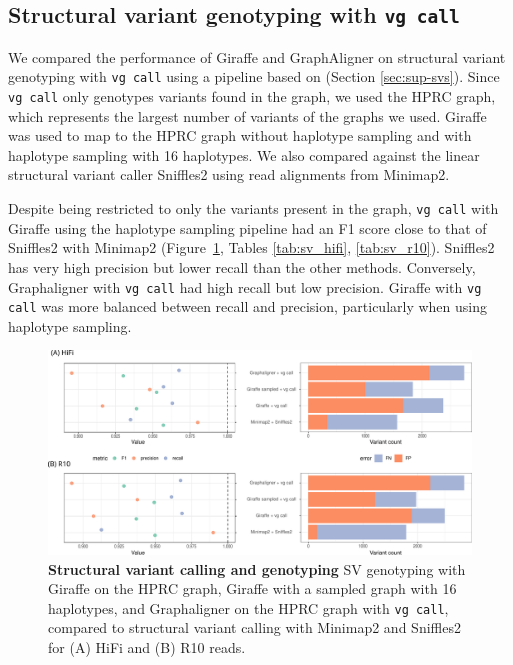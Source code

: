 \documentclass[11pt]{ucscthesis}
\begin{document}
\subsection{Structural variant genotyping with \texttt{vg call}}
We compared the performance of Giraffe and GraphAligner on structural variant genotyping with \texttt{vg call} using a pipeline based on \citet{hickey_vgsv_2020} (Section \ref{sec:sup-svs}).
Since \texttt{vg call} only genotypes variants found in the graph, we used the HPRC graph, which represents the largest number of variants of the graphs we used.
Giraffe was used to map to the HPRC graph without haplotype sampling and with haplotype sampling with 16 haplotypes.
We also compared against the linear structural variant caller Sniffles2 \cite{sedlazeck_sniffles_2018,smolka_sniffles2_2024} using read alignments from Minimap2.

Despite being restricted to only the variants present in the graph, \texttt{vg call} with Giraffe using the haplotype sampling pipeline had an F1 score close to that of Sniffles2 with Minimap2 (Figure~\ref{fig:sv_calling}, Tables \ref{tab:sv_hifi}, \ref{tab:sv_r10}).
Sniffles2 has very high precision but lower recall than the other methods.
Conversely, Graphaligner with \texttt{vg call} had high recall but low precision.
Giraffe with \texttt{vg call} was more balanced between recall and precision, particularly when using haplotype sampling.

\begin{figure}[htb]
    \centering
    \includegraphics[width=\columnwidth]{lr_sv_calls.pdf}
    \caption[Long read structural variant calling and genotyping]{\textbf{Structural variant calling and genotyping} SV genotyping with Giraffe on the HPRC graph, Giraffe with a sampled graph with 16 haplotypes, and Graphaligner on the HPRC graph with \texttt{vg call}, compared to structural variant calling with Minimap2 and Sniffles2 for (A) HiFi and (B) R10 reads.}
    \label{fig:sv_calling}
\end{figure}
\end{document}
